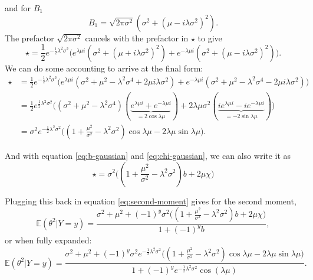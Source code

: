 \documentclass[]{report}
\begin{document}
and for $B_1$
\begin{equation}
    B_1 = \sqrt{2\pi\sigma^2} (\sigma^2 + (\mu - i \lambda \sigma^2)^2).
\end{equation}
The prefactor $\sqrt{2\pi\sigma^2}$ cancels with the prefactor in $\star$ to give
\begin{equation}
    \star = \frac{1}{2}e^{-\frac{1}{2}\lambda^2\sigma^2}
    \Big(
        e^{\lambda \mu i}(\sigma^2 + (\mu + i \lambda \sigma^2)^2) +
        e^{-\lambda \mu i}(\sigma^2 + (\mu - i \lambda \sigma^2)^2)
    \Big).
\end{equation}
We can do some accounting to arrive at the final form:
\begin{align}
    \star &= \frac{1}{2}e^{-\frac{1}{2}\lambda^2\sigma^2}
    \Big(
        e^{\lambda \mu i}(\sigma^2 + \mu^2 - \lambda^2\sigma^4 + 2\mu i \lambda \sigma^2) +
        e^{-\lambda \mu i}(\sigma^2 + \mu^2 - \lambda^2\sigma^4 - 2\mu i \lambda \sigma^2)
    \Big)\\
    &= \frac{1}{2}e^{\frac{1}{2}\lambda^2\sigma^2}
    \Big(
        (\sigma^2 + \mu^2 - \lambda^2\sigma^4)(\underbrace{e^{\lambda \mu i} + e^{-\lambda \mu i}}_{=2\cos{\lambda \mu}})
        + 2\lambda \mu \sigma^2(\underbrace{i e^{\lambda \mu i} - ie^{-\lambda \mu i}}_{=-2\sin{\lambda \mu}})
    \Big)\\
    &= \sigma^2 e^{-\frac{1}{2}\lambda^2\sigma^2}\Big((1 + \frac{\mu^2}{\sigma^2} - \lambda^2\sigma^2)\cos{\lambda \mu} - 2\lambda \mu \sin{\lambda \mu}\Big).
\end{align}

And with equation \eqref{eq:b-gaussian} and \eqref{eq:chi-gaussian}, we can also write it as
\begin{equation}
    \star = \sigma^2\Big( (1 + \frac{\mu^2}{\sigma^2} - \lambda^2\sigma^2)b +2\mu \chi\Big)
\end{equation}

Plugging this back in equation \eqref{eq:second-moment} gives for the second moment,
\begin{equation}
    \mathbb{E}(\theta^2 | Y=y) = \frac{\sigma^2 + \mu^2+ (-1)^y \sigma^2\Big( (1 + \frac{\mu^2}{\sigma^2} - \lambda^2\sigma^2)b +2\mu \chi\Big)}{1+(-1)^yb},
\end{equation}
or when fully expanded:
\begin{equation}
    \mathbb{E}(\theta^2 | Y=y) = \frac{\sigma^2 + \mu^2+ (-1)^y \sigma^2 e^{-\frac{1}{2}\lambda^2\sigma^2}\Big((1 + \frac{\mu^2}{\sigma^2} - \lambda^2\sigma^2)\cos{\lambda \mu} - 2\lambda \mu \sin{\lambda \mu}\Big)}{1+(-1)^ye^{-\frac{1}{2}\lambda^2\sigma^2}\cos(\lambda\mu)}.
\end{equation}
\end{document}
